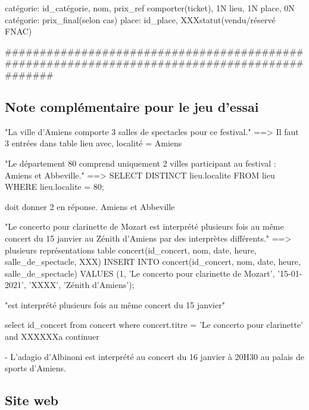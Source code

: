 \documentclass[12pt,a4paper]{article}
\begin{document}
{catégorie: id_catégorie, nom, prix_ref
comporter(ticket), 1N lieu, 1N place, 0N catégorie: prix_final(selon cas)
place: id_place, XXXstatut(vendu/réservé FNAC)

#############################################################################################




\subsection{Note complémentaire pour le jeu d'essai}


"La ville d'Amiens comporte 3 salles de spectacles pour ce festival."
==> Il faut 3 entrées dans table lieu avec, localité = Amiens



"Le département 80 comprend uniquement 2 villes participant au festival : Amiens et Abbeville."
==> 
SELECT DISTINCT lieu.localite
FROM lieu
WHERE lieu.localite = 80;

doit donner 2 en réponse. Amiens et Abbeville



"Le concerto pour clarinette de Mozart est interprété plusieurs fois au même concert du 15 janvier au Zénith d'Amiens par des interprètes différents."
==> plusieurs représentations 
table concert(id_concert, nom, date, heure, salle_de_spectacle, XXX)
INSERT INTO concert(id_concert, nom, date, heure, salle_de_spectacle) VALUES (1, 'Le concerto pour clarinette de Mozart', '15-01-2021', 'XXXX', 'Zénith d'Amiens');

"est interprété plusieurs fois au même concert du 15 janvier"



select id_concert
from concert
where concert.titre = 'Le concerto pour clarinette' and XXXXXXa continuer



- L'adagio d'Albinoni est interprété au concert du 16 janvier à 20H30 au palais de sports d'Amiens.





\subsection{Site web}


}
\end{document}
